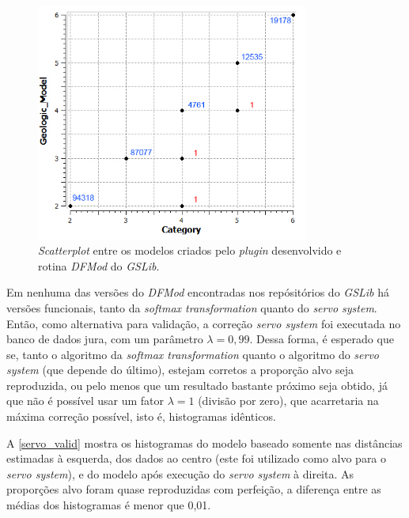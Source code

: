 \begin{figure}[H]
	\caption{\label{model_valid}\textit{Scatterplot} entre os modelos criados pelo \textit{plugin} desenvolvido e rotina \textit{DFMod} do \textit{GSLib}.}
	\begin{center}
		\includegraphics[width=0.8\textwidth]{modelagem_geologica/validation_models1}
	\end{center}
\end{figure}

Em nenhuma das versões do \textit{DFMod} encontradas nos repósitórios do \textit{GSLib} há versões funcionais, tanto da \textit{softmax transformation} quanto do \textit{servo system}. Então, como alternativa para validação, a correção \textit{servo system} foi executada no banco de dados jura, com um parâmetro $\lambda=0,99$. Dessa forma, é esperado que se, tanto o algoritmo da \textit{softmax transformation} quanto o algoritmo do \textit{servo system} (que depende do último), estejam corretos a proporção alvo seja reproduzida, ou pelo menos que um resultado bastante próximo seja obtido, já que não é possível usar um fator $\lambda=1$ (divisão por zero), que acarretaria na máxima correção possível, isto é, histogramas idênticos.

A \autoref{servo_valid} mostra os histogramas do modelo baseado somente nas distâncias estimadas à esquerda, dos dados ao centro (este foi utilizado como alvo para o \textit{servo system}), e do modelo após execução do \textit{servo system} à direita. As proporções alvo foram quase reproduzidas com perfeição, a diferença entre as médias dos histogramas é menor que 0,01.

